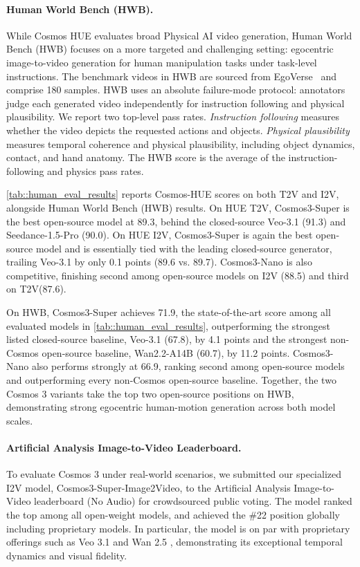 


\paragraph{Human World Bench (HWB).} While Cosmos HUE evaluates broad Physical AI video generation, Human World Bench (HWB) focuses on a more targeted and challenging setting: egocentric image-to-video generation for human manipulation tasks under task-level instructions.
The benchmark videos in HWB are sourced from EgoVerse~\citep{punamiya2026egoverse} and comprise 180 samples.
HWB uses an absolute failure-mode protocol: annotators judge each generated video independently for instruction following and physical plausibility. \label{subsec::hwb}
We report two top-level pass rates.
\emph{Instruction following} measures whether the video depicts the requested actions and objects.
\emph{Physical plausibility} measures temporal coherence and physical plausibility, including object dynamics, contact, and hand anatomy.
The HWB score is the average of the instruction-following and physics pass rates.


\cref{tab::human_eval_results} reports Cosmos-HUE scores on both T2V and I2V, alongside Human World Bench (HWB) results. On HUE T2V, Cosmos3-Super is the best open-source model at 89.3, behind the closed-source Veo-3.1 (91.3) and Seedance-1.5-Pro (90.0). On HUE I2V, Cosmos3-Super is again the best open-source model and is essentially tied with the leading closed-source generator, trailing Veo-3.1 by only 0.1 points (89.6 vs. 89.7). Cosmos3-Nano is also competitive, finishing second among open-source models on I2V (88.5) and third on T2V(87.6).

On HWB, Cosmos3-Super achieves 71.9, the state-of-the-art score among all evaluated models in \cref{tab::human_eval_results}, outperforming the strongest listed closed-source baseline, Veo-3.1 (67.8), by 4.1 points and the strongest non-Cosmos open-source baseline, Wan2.2-A14B (60.7), by 11.2 points.
Cosmos3-Nano also performs strongly at 66.9, ranking second among open-source models and outperforming every non-Cosmos open-source baseline.
Together, the two Cosmos 3 variants take the top two open-source positions on HWB, demonstrating strong egocentric human-motion generation across both model scales.


\paragraph{Artificial Analysis Image-to-Video Leaderboard.} To evaluate Cosmos 3 under real-world scenarios, we submitted our specialized I2V model, Cosmos3-Super-Image2Video, to the Artificial Analysis Image-to-Video leaderboard (No Audio) for crowdsourced public voting. The model ranked the top among all open-weight models, and achieved the \#22 position globally including proprietary models. In particular, the model is on par with proprietary offerings such as Veo 3.1 \citep{veo31} and Wan 2.5 \citep{wan2pt2}, demonstrating its exceptional temporal dynamics and visual fidelity.
